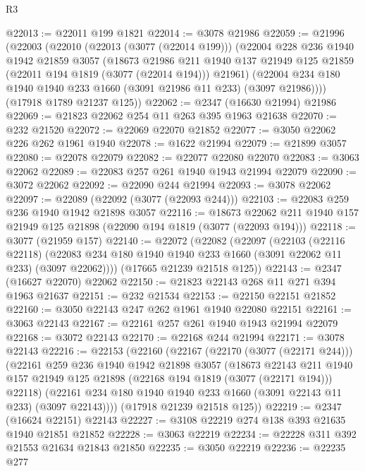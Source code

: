 \begin{lexlean}{R3}
\begin{coremodule}
@22013 := @22011 @199 @1821
@22014 := @3078 @21986
@22059 := @21996
    (@22003
      (@22010
        (@22013 (@3077 (@22014 @199)))
        (@22004
          @228
          @236
          @1940
          @1942
          @21859
          @3057
          (@18673
            @21986
            @211
            @1940
            @137
            @21949
            @125
            @21859
            (@22011 @194 @1819 (@3077 (@22014 @194)))
            @21961)
          (@22004 @234 @180 @1940 @1940 @233 @1660 (@3091 @21986 @11 @233) (@3097 @21986))))
      (@17918 @1789 @21237 @125))
@22062 := @2347 (@16630 @21994) @21986
@22069 := @21823 @22062 @254 @11 @263 @395 @1963 @21638
@22070 := @232 @21520
@22072 := @22069 @22070 @21852
@22077 := @3050 @22062 @226 @262 @1961 @1940
@22078 := @1622 @21994
@22079 := @21899 @3057
@22080 := @22078 @22079
@22082 := @22077 @22080 @22070
@22083 := @3063 @22062
@22089 := @22083 @257 @261 @1940 @1943 @21994 @22079
@22090 := @3072 @22062
@22092 := @22090 @244 @21994
@22093 := @3078 @22062
@22097 := @22089 (@22092 (@3077 (@22093 @244)))
@22103 := @22083 @259 @236 @1940 @1942 @21898 @3057
@22116 := @18673 @22062 @211 @1940 @157 @21949 @125 @21898 (@22090 @194 @1819 (@3077 (@22093 @194)))
@22118 := @3077 (@21959 @157)
@22140 := @22072
    (@22082
      (@22097
        (@22103
          (@22116 @22118)
          (@22083 @234 @180 @1940 @1940 @233 @1660 (@3091 @22062 @11 @233) (@3097 @22062))))
      (@17665 @21239 @21518 @125))
@22143 := @2347 (@16627 @22070) @22062
@22150 := @21823 @22143 @268 @11 @271 @394 @1963 @21637
@22151 := @232 @21534
@22153 := @22150 @22151 @21852
@22160 := @3050 @22143 @247 @262 @1961 @1940 @22080 @22151
@22161 := @3063 @22143
@22167 := @22161 @257 @261 @1940 @1943 @21994 @22079
@22168 := @3072 @22143
@22170 := @22168 @244 @21994
@22171 := @3078 @22143
@22216 := @22153
    (@22160
      (@22167
        (@22170 (@3077 (@22171 @244)))
        (@22161
          @259
          @236
          @1940
          @1942
          @21898
          @3057
          (@18673
            @22143
            @211
            @1940
            @157
            @21949
            @125
            @21898
            (@22168 @194 @1819 (@3077 (@22171 @194)))
            @22118)
          (@22161 @234 @180 @1940 @1940 @233 @1660 (@3091 @22143 @11 @233) (@3097 @22143))))
      (@17918 @21239 @21518 @125))
@22219 := @2347 (@16624 @22151) @22143
@22227 := @3108 @22219 @274 @138 @393 @21635 @1940 @21851 @21852
@22228 := @3063 @22219
@22234 := @22228 @311 @392 @21553 @21634 @21843 @21850
@22235 := @3050 @22219
@22236 := @22235 @277

\end{coremodule}
\end{lexlean}
